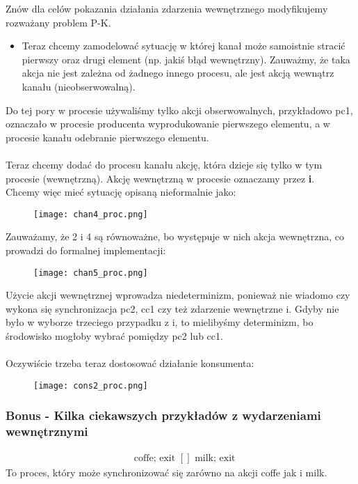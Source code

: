 \documentclass[a4paper,15pt]{article}
\newcommand{\example}[2]{
    \begin{tcolorbox}[colback=blue!5!white,colframe=blue,title={Przykład #1}]
        #2
    \end{tcolorbox}
}
\begin{document}
Znów dla celów pokazania działania zdarzenia wewnętrznego modyfikujemy rozważany problem P-K. 
\begin{itemize}
\item  Teraz chcemy zamodelować sytuację w której kanał może samoistnie stracić pierwszy oraz drugi element (np. jakiś błąd wewnętrzny). Zauważmy, że taka akcja nie jest zależna od żadnego innego procesu, ale jest akcją wewnątrz kanału (nieobserwowalną).
\end{itemize}

Do tej pory w procesie używaliśmy tylko akcji obserwowalnych, przykładowo pc1, oznaczało w procesie producenta wyprodukowanie pierwszego elementu, a w procesie kanału odebranie pierwszego elementu. \\ \\
Teraz chcemy dodać do procesu kanału akcję, która dzieje się tylko w tym procesie (wewnętrzną). Akcję wewnętrzną w procesie oznaczamy przez \textbf{i}. \\
Chcemy więc mieć sytuację opisaną nieformalnie jako:


\begin{figure}[H]
\centerline{\texttt{[image: chan4\_proc.png]}}
\label{fig:chan4_proc}
\end{figure}

Zauważamy, że 2 i 4 są równoważne, bo występuje w nich akcja wewnętrzna, co prowadzi do formalnej implementacji:

\begin{figure}[H]
\centerline{\texttt{[image: chan5\_proc.png]}}
\label{fig:chan5_proc}
\end{figure}

Użycie akcji wewnętrznej wprowadza niedeterminizm, ponieważ nie wiadomo czy wykona się synchronizacja pc2, cc1 czy też zdarzenie wewnętrzne i. Gdyby nie było w wyborze trzeciego przypadku z i, to mielibyśmy determinizm, bo środowisko mogłoby wybrać pomiędzy pc2 lub cc1.  \\ \\
Oczywiście trzeba teraz dostosować działanie konsumenta:

\begin{figure}[H]
\centerline{\texttt{[image: cons2\_proc.png]}}
\label{fig:cons2_proc}
\end{figure}

\subsubsection{Bonus - Kilka ciekawszych przykładów z wydarzeniami wewnętrznymi}
\example{}{
\begin{align*}
& \text{coffe; exit } [] \text{ milk; exit}
\end{align*}
To proces, który może synchronizować się zarówno na akcji coffe jak i milk.
}
\end{document}
